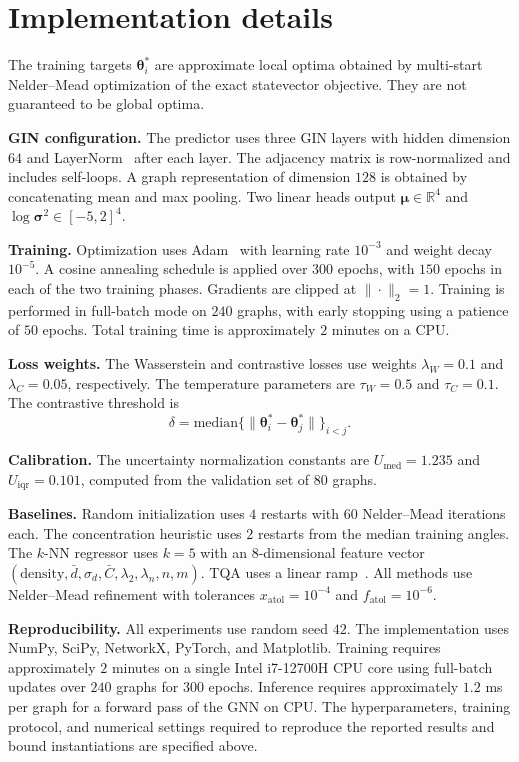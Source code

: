 \documentclass[aps,prx,reprint,superscriptaddress,longbibliography]{revtex4-2}
\newcommand{\GNN}{\textnormal{\textsc{GNN}}}
\newcommand{\GIN}{\textnormal{\textsc{GIN}}}
\newcommand{\bbR}{\mathbb{R}}
\begin{document}
\section{Implementation details}
\label{app:impl}

The training targets $\bm\theta_i^*$ are approximate local optima
obtained by multi-start Nelder--Mead optimization of the exact
statevector objective. They are not guaranteed to be global optima.
\label{app:local_optima}

\textbf{\GIN{} configuration.}
The predictor uses three \GIN{} layers with hidden dimension $64$ and
LayerNorm~\cite{ba2016} after each layer. The adjacency matrix is
row-normalized and includes self-loops. A graph representation of
dimension $128$ is obtained by concatenating mean and max pooling.
Two linear heads output $\bm\mu \in \bbR^4$ and
$\log \bm\sigma^2 \in [-5,2]^4$.

\textbf{Training.}
Optimization uses Adam~\cite{kingma2015} with learning rate $10^{-3}$
and weight decay $10^{-5}$. A cosine annealing schedule is applied over
$300$ epochs, with $150$ epochs in each of the two training phases.
Gradients are clipped at $\|\cdot\|_2 = 1$. Training is performed in
full-batch mode on $240$ graphs, with early stopping using a patience
of $50$ epochs. Total training time is approximately $2$ minutes on a
CPU.

\textbf{Loss weights.}
The Wasserstein and contrastive losses use weights
$\lambda_W = 0.1$ and $\lambda_C = 0.05$, respectively. The temperature
parameters are $\tau_W = 0.5$ and $\tau_C = 0.1$. The contrastive
threshold is
\[
\delta = \mathrm{median}\{\|\bm\theta_i^* - \bm\theta_j^*\|\}_{i<j}.
\]

\textbf{Calibration.}
The uncertainty normalization constants are
$U_{\mathrm{med}} = 1.235$ and $U_{\mathrm{iqr}} = 0.101$,
computed from the validation set of $80$ graphs.

\textbf{Baselines.}
Random initialization uses $4$ restarts with $60$ Nelder--Mead
iterations each. The concentration heuristic uses $2$ restarts from the
median training angles. The $k$-NN regressor uses $k{=}5$ with an
8-dimensional feature vector
$(\mathrm{density}, \bar{d}, \sigma_d, \bar{C}, \lambda_2,
\lambda_n, n, m)$. TQA uses a linear ramp~\cite{sack2021}. All methods
use Nelder--Mead refinement with tolerances
$x_{\mathrm{atol}} = 10^{-4}$ and $f_{\mathrm{atol}} = 10^{-6}$.

\textbf{Reproducibility.}
All experiments use random seed $42$. The implementation uses NumPy,
SciPy, NetworkX, PyTorch, and Matplotlib. Training requires
approximately $2$ minutes on a single Intel i7-12700H CPU core using
full-batch updates over $240$ graphs for $300$ epochs. Inference
requires approximately $1.2$ ms per graph for a forward pass of the
\GNN{} on CPU. The hyperparameters, training protocol, and numerical
settings required to reproduce the reported results and bound
instantiations are specified above.
\end{document}
